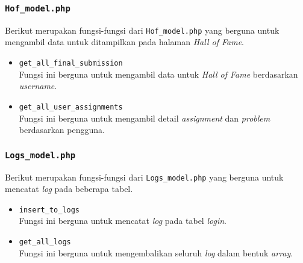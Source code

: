 \subsubsection{\texttt{Hof\_model.php}}
Berikut merupakan fungsi-fungsi dari \texttt{Hof\_model.php} yang berguna untuk mengambil data untuk ditampilkan pada halaman \textit{Hall of Fame}.
\begin{itemize}
	\item \texttt{get\_all\_final\_submission}\\
	Fungsi ini berguna untuk mengambil data untuk \textit{Hall of Fame} berdasarkan \textit{username}.
	\item \texttt{get\_all\_user\_assignments}\\
	Fungsi ini berguna untuk mengambil detail \textit{assignment} dan \textit{problem} berdasarkan pengguna.
\end{itemize}
\subsubsection{\texttt{Logs\_model.php}}
Berikut merupakan fungsi-fungsi dari \texttt{Logs\_model.php} yang berguna untuk mencatat \textit{log} pada beberapa tabel.
\begin{itemize}
	\item \texttt{insert\_to\_logs}\\
	Fungsi ini berguna untuk mencatat \textit{log} pada tabel \textit{login}.
	\item \texttt{get\_all\_logs}\\
	Fungsi ini berguna untuk mengembalikan seluruh \textit{log} dalam bentuk \textit{array}.
\end{itemize}
